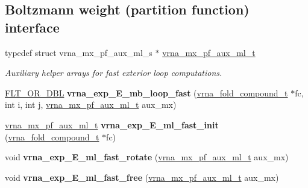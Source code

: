 \subsection*{Boltzmann weight (partition function) interface}
\begin{DoxyCompactItemize}
\item 
typedef struct vrna\+\_\+mx\+\_\+pf\+\_\+aux\+\_\+ml\+\_\+s $\ast$ \mbox{\hyperlink{group__eval__loops__mb_ga39a8cc1385dcb542a60a9393cde6a1e3}{vrna\+\_\+mx\+\_\+pf\+\_\+aux\+\_\+ml\+\_\+t}}
\begin{DoxyCompactList}\small\item\em Auxiliary helper arrays for fast exterior loop computations. \end{DoxyCompactList}\item 
\mbox{\label{group__eval__loops__mb_gac4a6acc1fded0e89460692ef9f62a6c2}} 
\mbox{\hyperlink{group__data__structures_ga31125aeace516926bf7f251f759b6126}{F\+L\+T\+\_\+\+O\+R\+\_\+\+D\+BL}} {\bfseries vrna\+\_\+exp\+\_\+\+E\+\_\+mb\+\_\+loop\+\_\+fast} (\mbox{\hyperlink{group__fold__compound_ga1b0cef17fd40466cef5968eaeeff6166}{vrna\+\_\+fold\+\_\+compound\+\_\+t}} $\ast$fc, int i, int j, \mbox{\hyperlink{group__eval__loops__mb_ga39a8cc1385dcb542a60a9393cde6a1e3}{vrna\+\_\+mx\+\_\+pf\+\_\+aux\+\_\+ml\+\_\+t}} aux\+\_\+mx)
\item 
\mbox{\label{group__eval__loops__mb_gab4ec400cb861b8102ca9974406d9de9b}} 
\mbox{\hyperlink{group__eval__loops__mb_ga39a8cc1385dcb542a60a9393cde6a1e3}{vrna\+\_\+mx\+\_\+pf\+\_\+aux\+\_\+ml\+\_\+t}} {\bfseries vrna\+\_\+exp\+\_\+\+E\+\_\+ml\+\_\+fast\+\_\+init} (\mbox{\hyperlink{group__fold__compound_ga1b0cef17fd40466cef5968eaeeff6166}{vrna\+\_\+fold\+\_\+compound\+\_\+t}} $\ast$fc)
\item 
\mbox{\label{group__eval__loops__mb_gabc73c029027ba09bfe70e2318052f0ae}} 
void {\bfseries vrna\+\_\+exp\+\_\+\+E\+\_\+ml\+\_\+fast\+\_\+rotate} (\mbox{\hyperlink{group__eval__loops__mb_ga39a8cc1385dcb542a60a9393cde6a1e3}{vrna\+\_\+mx\+\_\+pf\+\_\+aux\+\_\+ml\+\_\+t}} aux\+\_\+mx)
\item 
\mbox{\label{group__eval__loops__mb_ga3bbc24b3950867b039104ce8b4f39346}} 
void {\bfseries vrna\+\_\+exp\+\_\+\+E\+\_\+ml\+\_\+fast\+\_\+free} (\mbox{\hyperlink{group__eval__loops__mb_ga39a8cc1385dcb542a60a9393cde6a1e3}{vrna\+\_\+mx\+\_\+pf\+\_\+aux\+\_\+ml\+\_\+t}} aux\+\_\+mx)

\end{DoxyCompactItemize}
